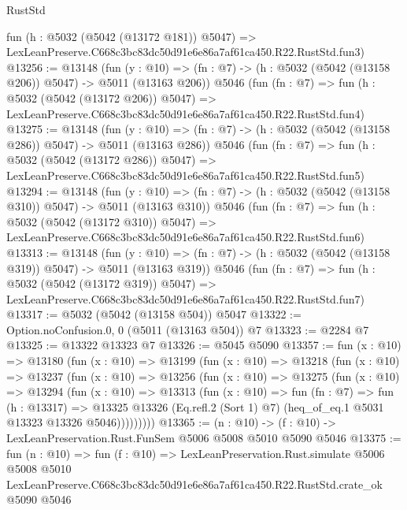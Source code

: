 \begin{lexlean}{RustStd}
\begin{coremodule}
    fun (h : @5032 (@5042 (@13172 @181)) @5047) =>
    LexLeanPreserve.C668c3bc83dc50d91e6e86a7af61ca450.R22.RustStd.fun3)
@13256 := @13148
    (fun (y : @10) => (fn : @7) -> (h : @5032 (@5042 (@13158 @206)) @5047) -> @5011 (@13163 @206))
    @5046
    (fun (fn : @7) =>
    fun (h : @5032 (@5042 (@13172 @206)) @5047) =>
    LexLeanPreserve.C668c3bc83dc50d91e6e86a7af61ca450.R22.RustStd.fun4)
@13275 := @13148
    (fun (y : @10) => (fn : @7) -> (h : @5032 (@5042 (@13158 @286)) @5047) -> @5011 (@13163 @286))
    @5046
    (fun (fn : @7) =>
    fun (h : @5032 (@5042 (@13172 @286)) @5047) =>
    LexLeanPreserve.C668c3bc83dc50d91e6e86a7af61ca450.R22.RustStd.fun5)
@13294 := @13148
    (fun (y : @10) => (fn : @7) -> (h : @5032 (@5042 (@13158 @310)) @5047) -> @5011 (@13163 @310))
    @5046
    (fun (fn : @7) =>
    fun (h : @5032 (@5042 (@13172 @310)) @5047) =>
    LexLeanPreserve.C668c3bc83dc50d91e6e86a7af61ca450.R22.RustStd.fun6)
@13313 := @13148
    (fun (y : @10) => (fn : @7) -> (h : @5032 (@5042 (@13158 @319)) @5047) -> @5011 (@13163 @319))
    @5046
    (fun (fn : @7) =>
    fun (h : @5032 (@5042 (@13172 @319)) @5047) =>
    LexLeanPreserve.C668c3bc83dc50d91e6e86a7af61ca450.R22.RustStd.fun7)
@13317 := @5032 (@5042 (@13158 @504)) @5047
@13322 := Option.noConfusion.{0, 0} (@5011 (@13163 @504)) @7
@13323 := @2284 @7
@13325 := @13322 @13323 @7
@13326 := @5045 @5090
@13357 := fun (x : @10) =>
  @13180
    (fun (x : @10) =>
    @13199
      (fun (x : @10) =>
      @13218
        (fun (x : @10) =>
        @13237
          (fun (x : @10) =>
          @13256
            (fun (x : @10) =>
            @13275
              (fun (x : @10) =>
              @13294
                (fun (x : @10) =>
                @13313
                  (fun (x : @10) =>
                  fun (fn : @7) =>
                  fun (h : @13317) =>
                  @13325
                    @13326
                    (Eq.refl.{2} (Sort 1) @7)
                    (heq_of_eq.{1} @5031 @13323 @13326 @5046)))))))))
@13365 := (n : @10) -> (f : @10) -> LexLeanPreservation.Rust.FunSem @5006 @5008 @5010 @5090 @5046
@13375 := fun (n : @10) =>
  fun (f : @10) =>
  LexLeanPreservation.Rust.simulate
    @5006
    @5008
    @5010
    LexLeanPreserve.C668c3bc83dc50d91e6e86a7af61ca450.R22.RustStd.crate_ok
    @5090
    @5046
\end{coremodule}
\end{lexlean}
